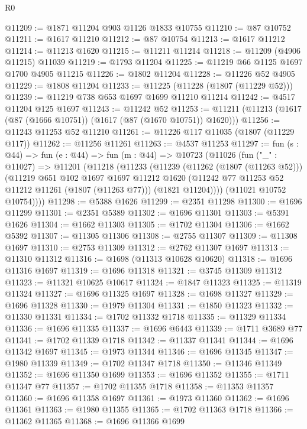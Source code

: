 \begin{lexlean}{R0}
\begin{coremodule}
@11209 := @1871 @11204 @903 @1126 @1833 @10755
@11210 := @87 @10752
@11211 := @1617 @11210
@11212 := @87 @10754
@11213 := @1617 @11212
@11214 := @11213 @1620
@11215 := @11211 @11214
@11218 := @11209 (@4906 @11215) @11039
@11219 := @1793 @11204
@11225 := @11219 @66 @1125 @1697 @1700 @4905 @11215
@11226 := @1802 @11204
@11228 := @11226 @52 @4905
@11229 := @1808 @11204
@11233 := @11225 (@11228 (@1807 (@11229 @52)))
@11239 := @11219 @738 @653 @1697 @1699 @11210 @11214
@11242 := @4517 @11204 @125 @1697
@11243 := @11242 @52
@11253 := @11211 (@11213 (@1617 (@87 (@1666 @10751)) (@1617 (@87 (@1670 @10751)) @1620)))
@11256 := @11243 @11253 @52 @11210
@11261 := @11226 @117 @11035 (@1807 (@11229 @117))
@11262 := @11256 @11261
@11263 := @4537 @11253
@11297 := fun (s : @44) =>
  fun (e : @44) =>
  fun (m : @44) =>
  @10723
    (@11026
      (fun ("_" : @11027) =>
      @11201
        (@11218
          (@11233
            (@11239
              (@11262 (@1807 (@11263 @52)))
              (@11219
                @651
                @102
                @1697
                @1697
                @11212
                @1620
                (@11242 @77 @11253 @52 @11212 @11261 (@1807 (@11263 @77)))
                (@1821 @11204))))
          (@11021 @10752 @10754))))
@11298 := @5388 @1626
@11299 := @2351 @11298
@11300 := @1696 @11299
@11301 := @2351 @5389
@11302 := @1696 @11301
@11303 := @5391 @1626
@11304 := @1662 @11303
@11305 := @1702 @11304
@11306 := @1662 @5392
@11307 := @11305 @11306
@11308 := @2755 @11307
@11309 := @11308 @1697
@11310 := @2753 @11309
@11312 := @2762 @11307 @1697
@11313 := @11310 @11312
@11316 := @1698 (@11313 @10628 @10620)
@11318 := @1696 @11316 @1697
@11319 := @1696 @11318
@11321 := @3745 @11309 @11312
@11323 := @11321 @10625 @10617
@11324 := @1847 @11323
@11325 := @11319 @11324
@11327 := @1696 @11325 @1697
@11328 := @1698 @11327
@11329 := @1696 @11328
@11330 := @1979 @11304
@11331 := @1850 @11323
@11332 := @11330 @11331
@11334 := @1702 @11332 @1718
@11335 := @11329 @11334
@11336 := @1696 @11335
@11337 := @1696 @6443
@11339 := @1711 @3689 @77
@11341 := @1702 @11339 @1718
@11342 := @11337 @11341
@11344 := @1696 @11342 @1697
@11345 := @1973 @11344
@11346 := @1696 @11345
@11347 := @1980 @11339
@11349 := @1702 @11347 @1718
@11350 := @11346 @11349
@11352 := @1696 @11350 @1699
@11353 := @1696 @11352
@11355 := @1711 @11347 @77
@11357 := @1702 @11355 @1718
@11358 := @11353 @11357
@11360 := @1696 @11358 @1697
@11361 := @1973 @11360
@11362 := @1696 @11361
@11363 := @1980 @11355
@11365 := @1702 @11363 @1718
@11366 := @11362 @11365
@11368 := @1696 @11366 @1699

\end{coremodule}
\end{lexlean}

